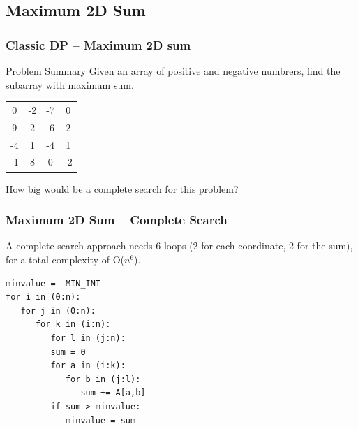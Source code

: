 \documentclass{beamer}
\begin{document}
\subsection{Maximum 2D Sum}
\begin{frame}
  \frametitle{Classic DP -- Maximum 2D sum}
  \begin{block}{Problem Summary}
    Given an array of positive and negative numbrers, find the
    subarray with maximum sum.
  \end{block}

  \bigskip

  \begin{center}
    \begin{tabular}{|cccc|}
      \hline
      0 & -2 & -7 & 0\\
      9 & 2 & -6 & 2\\
      -4 & 1 & -4 & 1\\
      -1 & 8 & 0 & -2\\
      \hline
    \end{tabular}
  \end{center}

  \bigskip

  How big would be a complete search for this problem?
\end{frame}

\begin{frame}
  \frametitle{Maximum 2D Sum -- Complete Search}

\begin{block}{}
  A complete search approach needs 6 loops (2 for each coordinate, 2
  for the sum), for a total complexity of O($n^6$).
\end{block}

{\smaller
\begin{verbatim}
minvalue = -MIN_INT
for i in (0:n):
   for j in (0:n):
      for k in (i:n):
         for l in (j:n):
         sum = 0
         for a in (i:k):
            for b in (j:l):
               sum += A[a,b]
         if sum > minvalue:
            minvalue = sum
\end{verbatim}
}
\end{frame}
\end{document}
